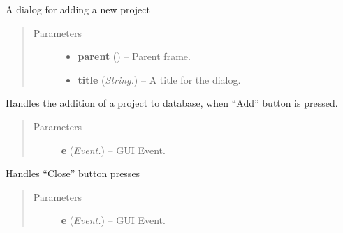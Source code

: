 \documentclass[letterpaper,10pt,english]{sphinxmanual}
\begin{document}
\begin{fulllineitems}
\label{api:wos.AddProjectDialog}
A dialog for adding a new project
\begin{quote}\begin{description}
\item[{Parameters}] \leavevmode\begin{itemize}
\item {} 
\textbf{parent} () -- Parent frame.

\item {} 
\textbf{title} (\emph{String.}) -- A title for the dialog.

\end{itemize}

\end{description}\end{quote}

\begin{fulllineitems}
\label{api:wos.AddProjectDialog.OnAdd}
Handles the addition of a project to database, when ``Add'' button is pressed.
\begin{quote}\begin{description}
\item[{Parameters}] \leavevmode
\textbf{e} (\emph{Event.}) -- GUI Event.

\end{description}\end{quote}

\end{fulllineitems}


\begin{fulllineitems}
\label{api:wos.AddProjectDialog.OnClose}
Handles ``Close'' button presses
\begin{quote}\begin{description}
\item[{Parameters}] \leavevmode
\textbf{e} (\emph{Event.}) -- GUI Event.

\end{description}\end{quote}

\end{fulllineitems}


\end{fulllineitems}
\end{document}
